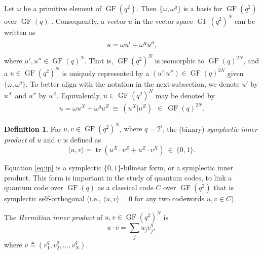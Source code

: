 \documentclass{ieeeaccess}
\DeclareMathOperator{\GF}{GF}
\DeclareMathOperator{\tr}{tr}
\let\emph\textit
\theoremstyle{definition}		%
\newtheorem{definition}{Definition}
\begin{document}
Let $\omega$ be a primitive element of $\GF(q^2)$. Then $\{\omega,\omega^q\}$   is a basis for $\GF(q^2)$ over $\GF(q)$ \cite{McE87,MU00,AK01,KKKS06}. 
%
Consequently,   a vector $u$ in the vector space $\GF(q^2)^N$ can be written as 
%
	\begin{align}
	u = \omega u' + \omega^q u'', 	\notag 
	\end{align}
	where $u', u'' \in\GF(q)^N$. 
	That is, $\GF(q^2)^N$ is isomorphic to $\GF(q)^{2N}$, and a $u\in\GF(q^2)^N$ is uniquely represented by a $(u'|u'')\in\GF(q)^{2N}$ given $\{\omega,\omega^q\}$.
	To better align with the notation in the next subsection, we denote $u'$ by $u^X$ and $u''$ by $u^Z$.
	Equivalently, $u\in\GF(q^2)^N$ may be denoted by 
	\begin{align}
		u = \omega u^X + \omega^q u^Z	~\equiv~  	(u^X|u^Z) 	 	~~\in~	\GF(q)^{2N}. \label{eq:vXZ}
	\end{align}
%
\begin{definition} \label{def:ip}
For $u,v\in\GF(q^2)^N$,  {where $q=2^l$,} the (binary) \emph{symplectic inner product} of $u$ and $v$ is defined as
	\begin{equation} \label{eq:ip}
	\langle u,v \rangle = \tr(u^X\cdot v^Z + u^Z\cdot v^X) ~\in~ \{0,1\}.
	\end{equation}

\end{definition}
%
Equation \eqref{eq:ip} is a symplectic $\{0,1\}$-bilinear form, or a symplectic inner product.
This form is important in the study of quantum codes, to link a quantum code over $\GF(q)$ as a classical code $C$ over $\GF(q^2)$ that is symplectic self-orthogonal (i.e., $\langle u,v \rangle= 0$ for any two codewords $u,v\in C$).


The \emph{Hermitian inner product} of $u,v\in\GF(q^2)^N$ is
	$$u\cdot \bar v = \textstyle \sum_j u_j v_j^q,$$
where $\bar v \triangleq (v_1^q,v_2^q,\dots,v_N^q)$.
%
\end{document}
